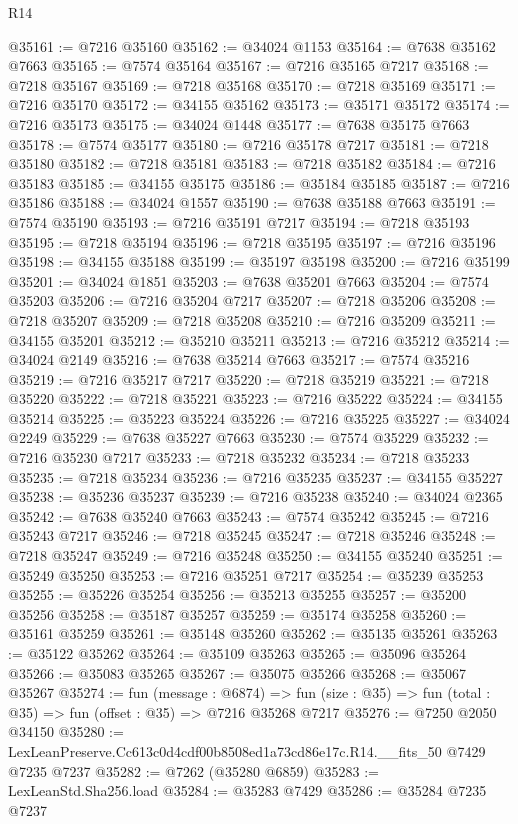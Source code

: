 \begin{lexlean}{R14}
\begin{coremodule}
@35161 := @7216 @35160
@35162 := @34024 @1153
@35164 := @7638 @35162 @7663
@35165 := @7574 @35164
@35167 := @7216 @35165 @7217
@35168 := @7218 @35167
@35169 := @7218 @35168
@35170 := @7218 @35169
@35171 := @7216 @35170
@35172 := @34155 @35162
@35173 := @35171 @35172
@35174 := @7216 @35173
@35175 := @34024 @1448
@35177 := @7638 @35175 @7663
@35178 := @7574 @35177
@35180 := @7216 @35178 @7217
@35181 := @7218 @35180
@35182 := @7218 @35181
@35183 := @7218 @35182
@35184 := @7216 @35183
@35185 := @34155 @35175
@35186 := @35184 @35185
@35187 := @7216 @35186
@35188 := @34024 @1557
@35190 := @7638 @35188 @7663
@35191 := @7574 @35190
@35193 := @7216 @35191 @7217
@35194 := @7218 @35193
@35195 := @7218 @35194
@35196 := @7218 @35195
@35197 := @7216 @35196
@35198 := @34155 @35188
@35199 := @35197 @35198
@35200 := @7216 @35199
@35201 := @34024 @1851
@35203 := @7638 @35201 @7663
@35204 := @7574 @35203
@35206 := @7216 @35204 @7217
@35207 := @7218 @35206
@35208 := @7218 @35207
@35209 := @7218 @35208
@35210 := @7216 @35209
@35211 := @34155 @35201
@35212 := @35210 @35211
@35213 := @7216 @35212
@35214 := @34024 @2149
@35216 := @7638 @35214 @7663
@35217 := @7574 @35216
@35219 := @7216 @35217 @7217
@35220 := @7218 @35219
@35221 := @7218 @35220
@35222 := @7218 @35221
@35223 := @7216 @35222
@35224 := @34155 @35214
@35225 := @35223 @35224
@35226 := @7216 @35225
@35227 := @34024 @2249
@35229 := @7638 @35227 @7663
@35230 := @7574 @35229
@35232 := @7216 @35230 @7217
@35233 := @7218 @35232
@35234 := @7218 @35233
@35235 := @7218 @35234
@35236 := @7216 @35235
@35237 := @34155 @35227
@35238 := @35236 @35237
@35239 := @7216 @35238
@35240 := @34024 @2365
@35242 := @7638 @35240 @7663
@35243 := @7574 @35242
@35245 := @7216 @35243 @7217
@35246 := @7218 @35245
@35247 := @7218 @35246
@35248 := @7218 @35247
@35249 := @7216 @35248
@35250 := @34155 @35240
@35251 := @35249 @35250
@35253 := @7216 @35251 @7217
@35254 := @35239 @35253
@35255 := @35226 @35254
@35256 := @35213 @35255
@35257 := @35200 @35256
@35258 := @35187 @35257
@35259 := @35174 @35258
@35260 := @35161 @35259
@35261 := @35148 @35260
@35262 := @35135 @35261
@35263 := @35122 @35262
@35264 := @35109 @35263
@35265 := @35096 @35264
@35266 := @35083 @35265
@35267 := @35075 @35266
@35268 := @35067 @35267
@35274 := fun (message : @6874) =>
  fun (size : @35) => fun (total : @35) => fun (offset : @35) => @7216 @35268 @7217
@35276 := @7250 @2050 @34150
@35280 := LexLeanPreserve.Cc613c0d4cdf00b8508ed1a73cd86e17c.R14.__fits_50 @7429 @7235 @7237
@35282 := @7262 (@35280 @6859)
@35283 := LexLeanStd.Sha256.load
@35284 := @35283 @7429
@35286 := @35284 @7235 @7237

\end{coremodule}
\end{lexlean}
